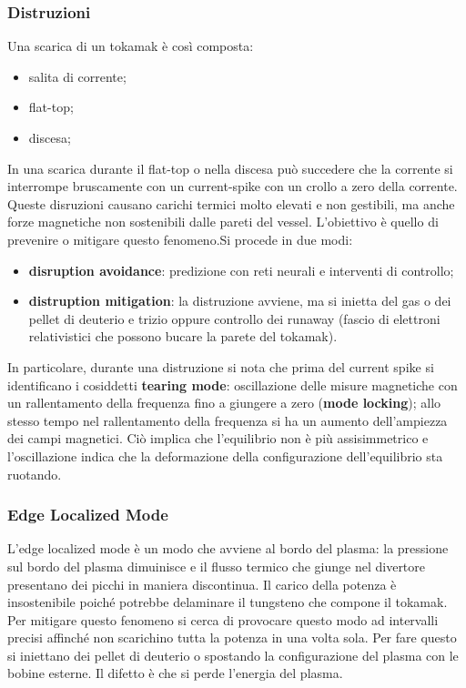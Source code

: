 \documentclass{article}
\begin{document}
\subsubsection{Distruzioni}
Una scarica di un tokamak è così composta:\begin{itemize}
    \item salita di corrente;
    \item flat-top;
    \item discesa;
\end{itemize}
In una scarica durante il flat-top o nella discesa può succedere che la corrente si interrompe bruscamente con un current-spike con un crollo a zero della corrente. Queste disruzioni causano carichi termici molto elevati e non gestibili, ma anche forze magnetiche non sostenibili dalle pareti del vessel. L'obiettivo è quello di prevenire o mitigare questo fenomeno.Si procede in due modi:\begin{itemize}
    \item \textbf{disruption avoidance}: predizione con reti neurali e interventi di controllo;
    \item \textbf{distruption mitigation}: la distruzione avviene, ma si inietta del gas o dei pellet di deuterio e trizio oppure controllo dei runaway (fascio di elettroni relativistici che possono bucare la parete del tokamak).
\end{itemize}
In particolare, durante una distruzione si nota che prima del current spike si identificano i cosiddetti \textbf{tearing mode}: oscillazione delle misure magnetiche con un rallentamento della frequenza fino a giungere a zero (\textbf{mode locking}); allo stesso tempo nel rallentamento della frequenza si ha un aumento dell'ampiezza dei campi magnetici. Ciò implica che l'equilibrio non è più assisimmetrico e l'oscillazione indica che la deformazione della configurazione dell'equilibrio sta ruotando.
\subsubsection{Edge Localized Mode}
L'edge localized mode è un modo che avviene al bordo del plasma: la pressione sul bordo del plasma dimuinisce e il flusso termico che giunge nel divertore presentano dei picchi in maniera discontinua. Il carico della potenza è insostenibile poiché potrebbe delaminare il tungsteno che compone il tokamak. Per mitigare questo fenomeno si cerca di provocare questo modo ad intervalli precisi affinché non scarichino tutta la potenza in una volta sola. Per fare questo si iniettano dei pellet di deuterio o spostando la configurazione del plasma con le bobine esterne. Il difetto è che si perde l'energia del plasma.
\end{document}
